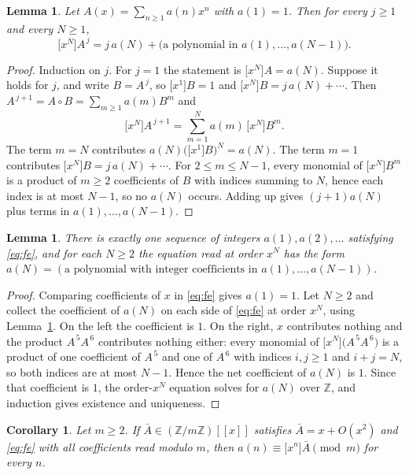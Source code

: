 \documentclass[11pt,a4paper]{article}
\theoremstyle{plain}
\newtheorem{lemma}[theorem]{Lemma}
\newtheorem{corollary}[theorem]{Corollary}
\theoremstyle{definition}
\begin{document}
\begin{lemma}\label{lem:jaN}
Let $A(x)=\sum_{n\ge1}a(n)x^{n}$ with $a(1)=1$. Then for every $j\ge1$ and every
$N\ge1$,
\[
\bigl[x^{N}\bigr]A^{\,j}=j\,a(N)+\bigl(\text{a polynomial in }a(1),\dots,a(N-1)\bigr).
\]
\end{lemma}

\begin{proof}
Induction on $j$. For $j=1$ the statement is $\bigl[x^{N}\bigr]A=a(N)$. Suppose it holds
for $j$, and write $B=A^{\,j}$, so $\bigl[x^{1}\bigr]B=1$ and
$\bigl[x^{N}\bigr]B=j\,a(N)+\cdots$. Then $A^{\,j+1}=A\circ B=\sum_{m\ge1}a(m)B^{m}$
and
\[
\bigl[x^{N}\bigr]A^{\,j+1}=\sum_{m=1}^{N}a(m)\,\bigl[x^{N}\bigr]B^{m} .
\]
The term $m=N$ contributes $a(N)\bigl(\bigl[x^{1}\bigr]B\bigr)^{N}=a(N)$. The term $m=1$
contributes $\bigl[x^{N}\bigr]B=j\,a(N)+\cdots$. For $2\le m\le N-1$, every monomial of
$\bigl[x^{N}\bigr]B^{m}$ is a product of $m\ge2$ coefficients of $B$ with indices summing
to $N$, hence each index is at most $N-1$, so no $a(N)$ occurs. Adding up gives
$(j+1)a(N)$ plus terms in $a(1),\dots,a(N-1)$.
\end{proof}

\begin{lemma}\label{lem:unique}
There is exactly one sequence of integers $a(1),a(2),\dots$ satisfying \eqref{eq:fe}, and
for each $N\ge2$ the equation read at order $x^{N}$ has the form
$a(N)=(\text{a polynomial with integer coefficients in }a(1),\dots,a(N-1))$.
\end{lemma}

\begin{proof}
Comparing coefficients of $x$ in \eqref{eq:fe} gives $a(1)=1$. Let $N\ge2$ and collect the
coefficient of $a(N)$ on each side of \eqref{eq:fe} at order $x^{N}$, using
Lemma~\ref{lem:jaN}. On the left the coefficient is $1$. On the right, $x$ contributes nothing and the product $A^{\,5}A^{\,6}$ contributes nothing either: every monomial of $\bigl[x^{N}\bigr]\bigl(A^{\,5}A^{\,6}\bigr)$ is a product of one coefficient of $A^{\,5}$ and one of $A^{\,6}$ with indices $i,j\ge1$ and $i+j=N$, so both indices are at most $N-1$. Hence the net coefficient of $a(N)$ is $1$.
Since that coefficient is $1$, the order-$x^{N}$ equation solves for $a(N)$ over
$\mathbb{Z}$, and induction gives existence and uniqueness.
\end{proof}

\begin{corollary}\label{cor:mod}
Let $m\ge2$. If $\bar A\in(\mathbb{Z}/m\mathbb{Z})[[x]]$ satisfies $\bar A=x+O(x^{2})$ and
\eqref{eq:fe} with all coefficients read modulo $m$, then
$a(n)\equiv\bigl[x^{n}\bigr]\bar A\pmod m$ for every $n$.
\end{corollary}
\end{document}
